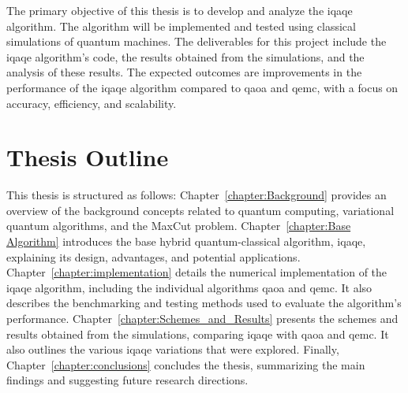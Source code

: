 
The primary objective of this thesis is to develop and analyze the \acrshort{iqaqe} algorithm. The algorithm will be implemented and tested using classical simulations of quantum machines. The deliverables for this project include the \acrshort{iqaqe} algorithm's code, the results obtained from the simulations, and the analysis of these results. The expected outcomes are improvements in the performance of the \acrshort{iqaqe} algorithm compared to \acrshort{qaoa} and \acrshort{qemc}, with a focus on accuracy, efficiency, and scalability.

\section{Thesis Outline}
\label{section:outline}




This thesis is structured as follows: Chapter~\ref{chapter:Background} provides an overview of the background concepts related to quantum computing, variational quantum algorithms, and the MaxCut problem. Chapter~\ref{chapter:Base Algorithm} introduces the base hybrid quantum-classical algorithm, \acrshort{iqaqe}, explaining its design, advantages, and potential applications. Chapter~\ref{chapter:implementation} details the numerical implementation of the \acrshort{iqaqe} algorithm, including the individual algorithms \acrshort{qaoa} and \acrshort{qemc}. It also describes the benchmarking and testing methods used to evaluate the algorithm's performance. Chapter~\ref{chapter:Schemes_and_Results} presents the schemes and results obtained from the simulations, comparing \acrshort{iqaqe} with \acrshort{qaoa} and \acrshort{qemc}. It also outlines the various \acrshort{iqaqe} variations that were explored. Finally, Chapter~\ref{chapter:conclusions} concludes the thesis, summarizing the main findings and suggesting future research directions.
